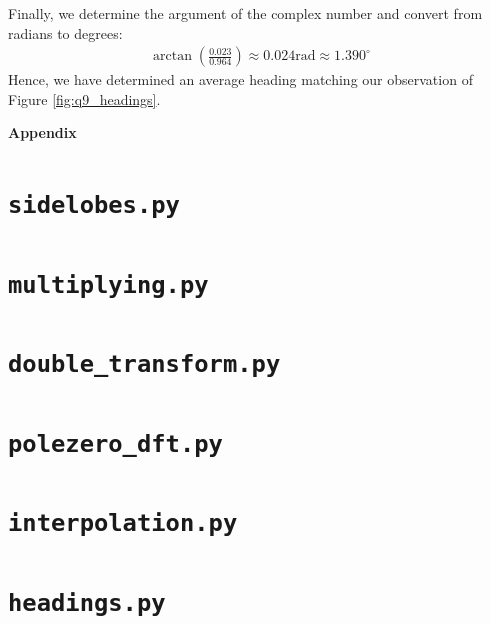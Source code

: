 \documentclass[a4paper, 11pt]{article}
\begin{document}
Finally, we determine the argument of the complex number and convert from
radians to degrees:
\begin{align*}
    \arctan(\frac{0.023}{0.964}) \approx 0.024 \text{rad} \approx 1.390^\circ
\end{align*}
Hence, we have determined an average heading matching our observation of Figure
\ref{fig:q9_headings}.

\newpage
\appendix
\begin{center}
    \LARGE{\textbf{Appendix}}
\end{center}

\section{\texttt{sidelobes.py}}


\newpage
\section{\texttt{multiplying.py}}


\newpage
\section{\texttt{double\_transform.py}}


\newpage
\section{\texttt{polezero\_dft.py}}


\newpage
\section{\texttt{interpolation.py}}


\newpage
\section{\texttt{headings.py}}

\end{document}
